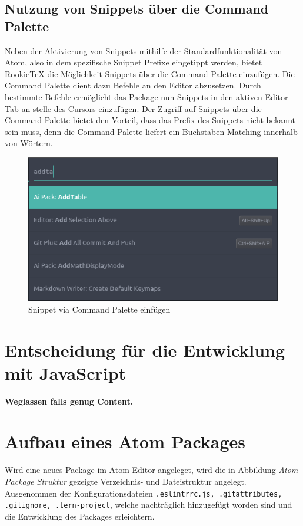         \subsection{Nutzung von Snippets über die Command Palette}
            Neben der Aktivierung von Snippets mithilfe der Standardfunktionalität von Atom, also in dem spezifische Snippet Prefixe eingetippt werden, bietet RookieTeX die Möglichkeit Snippets über die Command Palette einzufügen. Die Command Palette dient dazu Befehle an den Editor abzusetzen. Durch bestimmte Befehle ermöglicht das Package nun \latex Snippets in den aktiven Editor-Tab an stelle des Cursors einzufügen. Der Zugriff auf Snippets über die Command Palette bietet den Vorteil, dass das Prefix des Snippets nicht bekannt sein muss, denn die Command Palette liefert ein Buchstaben-Matching innerhalb von Wörtern.
            \begin{figure}[H]
                \centering
                    \includegraphics[scale=0.5]{img/snippets_via_cp.png}
                    \caption{Snippet via Command Palette einfügen}
            \end{figure}

    \section{Entscheidung für die Entwicklung mit JavaScript}
    \textbf{Weglassen falls genug Content.}

    \section{Aufbau eines Atom Packages}
        Wird eine neues Package im Atom Editor angeleget, wird die in Abbildung \textit{Atom Package Struktur} gezeigte Verzeichnis- und Dateistruktur angelegt. Ausgenommen der Konfigurationsdateien \texttt{.eslintrrc.js, .gitattributes, .gitignore, .tern-project}, welche nachträglich hinzugefügt worden sind und die Entwicklung des Packages erleichtern.

